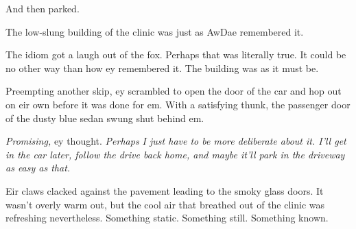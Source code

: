 And then parked.

The low-slung building of the clinic was just as AwDae remembered it.

The idiom got a laugh out of the fox. Perhaps that was literally true. It could be no other way than how ey remembered it. The building was as it must be.

Preempting another skip, ey scrambled to open the door of the car and hop out on eir own before it was done for em. With a satisfying thunk, the passenger door of the dusty blue sedan swung shut behind em.

\emph{Promising,} ey thought. \emph{Perhaps I just have to be more deliberate about it. I'll get in the car later, follow the drive back home, and maybe it'll park in the driveway as easy as that.}

Eir claws clacked against the pavement leading to the smoky glass doors. It wasn't overly warm out, but the cool air that breathed out of the clinic was refreshing nevertheless. Something static. Something still. Something known.
